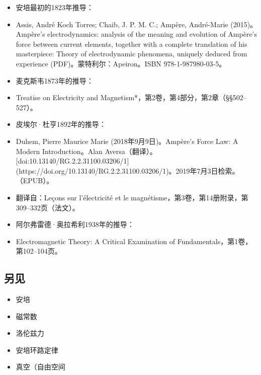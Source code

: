 \begin{itemize}
\item 安培最初的1823年推导：
\item Assis, André Koch Torres; Chaib, J. P. M. C.; Ampère, André-Marie (2015)。Ampère's electrodynamics: analysis of the meaning and evolution of Ampère's force between current elements, together with a complete translation of his masterpiece: Theory of electrodynamic phenomena, uniquely deduced from experience (PDF)。蒙特利尔：Apeiron。ISBN 978-1-987980-03-5。
\item 麦克斯韦1873年的推导：
\item Treatise on Electricity and Magnetism*，第2卷，第4部分，第2章（§§502–527）。
\item 皮埃尔·杜亨1892年的推导：
\item Duhem, Pierre Maurice Marie (2018年9月9日)。Ampère's Force Law: A Modern Introduction。Alan Aversa（翻译）。[doi:10.13140/RG.2.2.31100.03206/1](https://doi.org/10.13140/RG.2.2.31100.03206/1)。2019年7月3日检索。（EPUB）。
\item 翻译自：Leçons sur l’électricité et le magnétisme，第3卷，第14册附录，第309–332页（法文）。
\item 阿尔弗雷德·奥拉希利1938年的推导：
\item Electromagnetic Theory: A Critical Examination of Fundamentals，第1卷，第102–104页。
\end{itemize}
\subsection{另见}
\begin{itemize}
\item 安培  
\item 磁常数  
\item 洛伦兹力  
\item 安培环路定律  
\item 真空（自由空间
\end{itemize}
